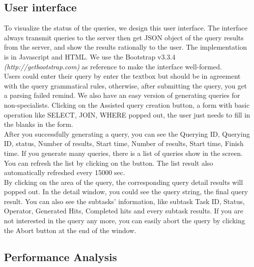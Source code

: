 \documentclass{article}
\begin{document}
\subsection{User interface}
To visualize the status of the queries, we design this user  interface. The interface always transmit queries to the server then get JSON object of the query results from the server, and show the results rationally to the user. The implementation is in Javascript and HTML. We use the Bootstrap v3.3.4 
 \emph{(http://getbootstrap.com)} as reference to make the interface well-formed.\\
 Users could enter their query by enter the textbox but should be in agreement with the query grammatical rules, otherwise, after submitting the query, you get a parsing failed remind. We also have an easy version of generating queries for non-specialists. Clicking on the Assisted query creation button, a form with basic operation like SELECT, JOIN, WHERE popped out, the user just needs to fill in the blanks in the form.\\
 After you successfully generating a query, you can see the Querying ID,  Querying ID,  status, Number of results, Start time, Number of results, Start time, Finish time. If you generate many queries, there is a list of queries show in the screen. You can refresh the list by clicking on the button. The list result also automatically refreshed every 15000 sec. \\
By clicking on the area of the query, the corresponding query detail results will popped out. In the detail window, you could see the query string, the final query result. You can also see the subtasks' information, like subtask Task ID, Status, Operator, Generated Hits, Completed hits and every subtask results. If you are not interested in the query any more, you can easily abort the query by clicking the Abort button at the end of the window.
\subsection{Performance Analysis}
\end{document}
